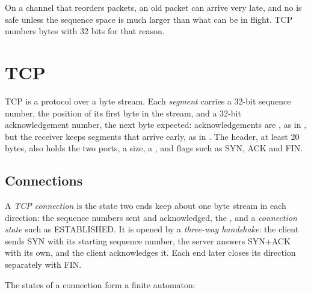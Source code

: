 \label{out:b2:transport-layer:too-wide}

On a channel that reorders packets, an old packet can arrive very late, and no  is safe unless the sequence
space is much larger than what can be in flight. TCP numbers bytes with 32 bits for that reason.

\section{TCP}\label{sec:b2:transport-layer:tcp}

TCP is a  protocol over a byte stream. Each \emph{segment} carries a 32-bit sequence number, the
position of its first byte in the stream, and a 32-bit acknowledgement number, the next byte expected: acknowledgements
are , as in , but the receiver keeps segments that arrive early, as in . The
header, at least 20 bytes, also holds the two ports, a  size, a , and flags such as SYN, ACK and FIN.

\subsection{Connections}

\begin{definition}\label{def:b2:transport-layer:tcp}
A \emph{TCP connection} is the state two ends keep about one byte stream in each direction:
the sequence numbers sent and acknowledged, the , and a \emph{connection state} such as ESTABLISHED. It is
opened by a \emph{three-way handshake}: the client sends SYN with its starting sequence
number, the server answers SYN+ACK with its own, and the client acknowledges it. Each end later closes its
direction separately with FIN.
\end{definition}

The states of a connection form a finite automaton:

\label{out:b2:transport-layer:states}

